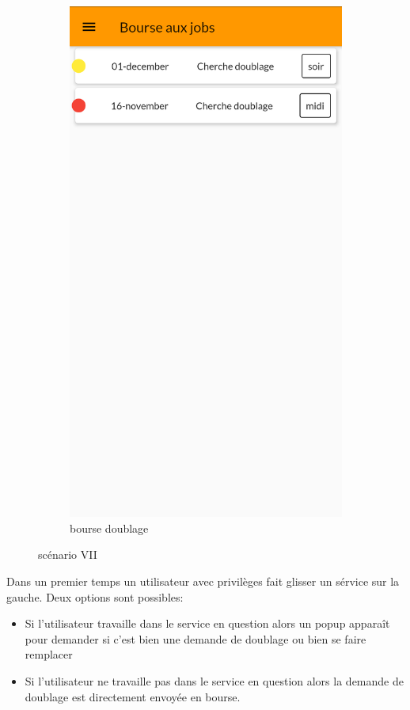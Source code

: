 \begin{figure}[!h]
\begin{subfigure}{.3\textwidth}
                \includegraphics[width=0.9\linewidth]{screenshots/scenario_07/bourse_doublage.png}
                \caption{bourse doublage}
                \label{fig:bourse_doublage}
            \end{subfigure}
            \caption{scénario VII}
            \label{fig:scen07}
        \end{figure}

        Dans un premier temps un utilisateur avec privilèges fait glisser un sérvice 
        sur la gauche. Deux options sont possibles:
        \begin{itemize}
            \item Si l'utilisateur travaille dans le service en question alors un popup apparaît pour demander si c'est bien une demande de doublage ou bien se faire remplacer
            \item Si l'utilisateur ne travaille pas dans le service en question alors la demande de doublage est directement envoyée en bourse.
        \end{itemize}




